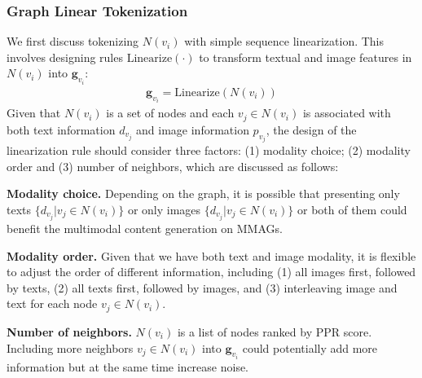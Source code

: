 \subsubsection{Graph Linear Tokenization}

We first discuss tokenizing $N(v_i)$ with simple sequence linearization. This involves designing rules $\text{Linearize}(\cdot)$ to transform textual and image features in $N(v_i)$ into $\bm{g}_{v_i}$:
\begin{gather}
    \bm{g}_{v_i} = \text{Linearize}(N(v_i))
\end{gather}
Given that $N(v_i)$ is a set of nodes and each $v_j\in N(v_i)$ is associated with both text information $d_{v_j}$ and image information $p_{v_j}$, the design of the linearization rule should consider three factors: (1) modality choice; (2) modality order and (3) number of neighbors, which are discussed as follows:


\vspace{0.05in}
\noindent
\textbf{Modality choice.} Depending on the graph, it is possible that presenting only texts $\{d_{v_j}| v_j\in N(v_i)\}$ or only images $\{d_{v_j}| v_j\in N(v_i)\}$ or both of them could benefit the multimodal content generation on MMAGs.

\vspace{0.05in}
\noindent
\textbf{Modality order.} Given that we have both text and image modality, it is flexible to adjust the order of different information, including (1) all images first, followed by texts, (2) all texts first, followed by images, and (3) interleaving image and text for each node $v_j \in N(v_i)$.

\vspace{0.05in}
\noindent
\textbf{Number of neighbors.} $N(v_i)$ is a list of nodes ranked by PPR score. Including more neighbors $v_j\in N(v_i)$ into $\bm{g}_{v_i}$ could potentially add more information but at the same time increase noise.

